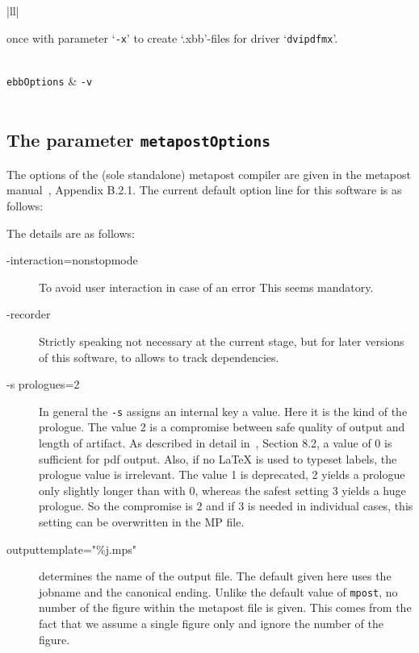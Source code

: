\begin{longtable}{|ll|}
{\begin{minipage}{0.95\linewidth}
once with parameter `\texttt{-x}' 
to create `.xbb'-files for driver `\texttt{dvipdfmx}'. 
\end{minipage}
} \\
\texttt{ebbOptions} & \texttt{-v} \\
 \\
\end{longtable}

\subsection{The parameter \texttt{metapostOptions}}%
\label{subsec:metapostOptions}

The options of the (sole standalone) metapost compiler 
are given in the metapost manual~\cite{MPost}, Appendix B.2.1. 
The current default option line for this software is as follows: 
%
\begin{center}
  {\scriptsize\texttt{\metapostOptions}}
\end{center}

The details are as follows: 
%
\begin{description}
  \item[-interaction=nonstopmode] To avoid user interaction in case of an error 
  This seems mandatory. 
  \item[-recorder] Strictly speaking not necessary at the current stage, 
    but for later versions of this software, to allows to track dependencies. 
  \item[-s prologues=2] In general the \texttt{-s} assigns an internal key a value. 
  Here it is the kind of the prologue. 
  The value 2 is a compromise between safe quality of output and length of artifact. 
  As described in detail in~\cite{MPost}, Section 8.2, a value of 0 is sufficient for pdf output. 
  Also, if no \LaTeX{} is used to typeset labels, the prologue value is irrelevant. 
  The value 1 is deprecated, 2 yields a prologue only slightly longer than with 0, 
  whereas the safest setting 3 yields a huge prologue. 
  So the compromise is 2 and if 3 is needed in individual cases, 
  this setting can be overwritten in the MP file. 
  \item[outputtemplate="\%j.mps"] determines the name of the output file. %
  The default given here uses the jobname and the canonical ending. 
  Unlike the default value of \texttt{mpost}, 
  no number of the figure within the metapost file is given. 
  This comes from the fact that we assume a single figure only 
  and ignore the number of the figure. 
  \end{description}

